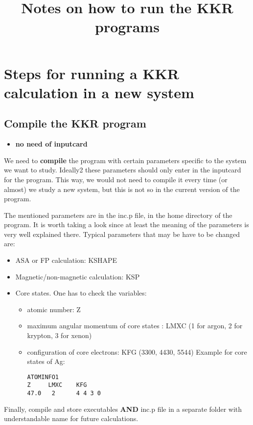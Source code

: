 \documentclass[a4paper,10pt,fullpage]{report}
\title{\textbf{Notes on how to run the KKR programs}}
\begin{document}
\maketitle

\chapter{Steps for running a KKR calculation in a new system}


\section{Compile the KKR program}
\label{sec:compile}

\begin{itemize}
\item \textbf{no need of inputcard}
\end{itemize}

We need to \textbf{compile} the program with certain parameters specific to
the system we want to study. Ideally2 these 
parameters should only enter in the inputcard for the program.
This way, we would not need to compile it every time (or almost) 
we study a new system, but this is not so in the current version of the program.

The mentioned parameters are in the inc.p file, in the home directory
of the program. It is worth taking a look since at least the meaning 
of the parameters is very well explained there. Typical parameters
that may be have to be changed are:

\begin{itemize}
\item ASA or FP calculation: KSHAPE
\item Magnetic/non-magnetic calculation:  KSP
\item Core states. One has to check the variables:
 \begin{itemize}
 
 \item atomic number: Z
 \item maximum angular momentum of core states : LMXC (1 for argon, 2 for krypton, 3 for xenon)
 \item configuration of core electrons: KFG (3300, 4430, 5544) 
Example for core states of Ag:
\begin{verbatim}
ATOMINFO1
Z     LMXC    KFG     
47.0   2      4 4 3 0
\end{verbatim} 

 
\end{itemize} 
 

\end{itemize}
Finally, compile and store executables \textbf{AND} inc.p file in a separate folder with
understandable name for future calculations. 
\end{document}
